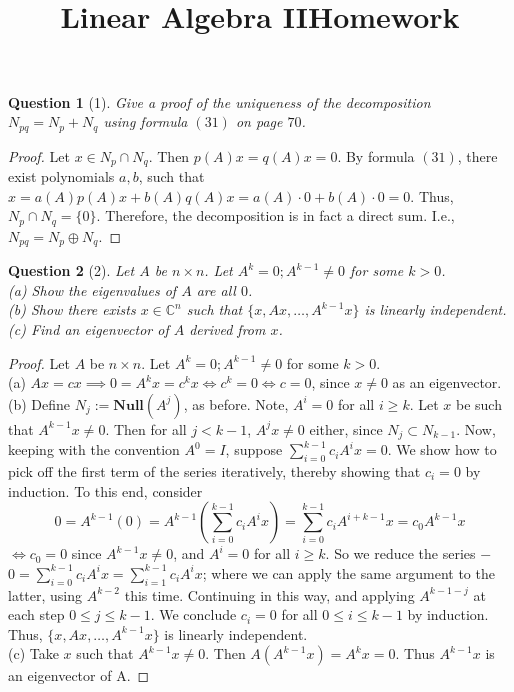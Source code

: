 \documentclass[11pt]{article}
\title{\vspace{-50pt}
\Huge \name
\\\vspace{20pt}
\huge Linear Algebra II\hfill Homework \hw}
\author{}
\date{}
\theoremstyle{quest}
\newtheorem*{question}{Question}
\begin{document}
\maketitle

\begin{question}[1]
Give a proof of the uniqueness of the decomposition $N_{pq} = N_p + N_q$ using formula $(31)$ on page $70$.
\end{question}
\begin{proof}
Let $x \in N_p \cap N_q$. Then $p(A)x = q(A)x = 0$. By formula $(31)$, there exist polynomials $a, b$, such that $x = a(A)p(A)x + b(A)q(A)x = a(A) \cdot 0 + b(A) \cdot 0 = 0$. Thus, $N_p \cap N_q = \{0\}$. Therefore, the decomposition is in fact a direct sum. I.e., $N_{pq} = N_p \oplus N_q$.
\end{proof}
\begin{question}[2]
Let $A$ be $n \times n$. Let $A^k = 0; A^{k-1} \ne 0$ for some $k > 0$.
\\(a) Show the eigenvalues of $A$ are all $0$.
\\(b) Show there exists $x \in \mathbb{C}^n$ such that $\{x, Ax, \ldots, A^{k-1}x\}$ is linearly independent.
\\(c) Find an eigenvector of $A$ derived from $x$.
\end{question}
\begin{proof}
Let $A$ be $n \times n$. Let $A^k = 0; A^{k-1} \ne 0$ for some $k > 0$.
\\(a) $Ax = cx \implies 0 = A^k x = c^k x \iff c^k = 0 \iff c = 0$, since $x \ne 0$ as an eigenvector.
\\ (b) Define $N_j := \mathbf{Null}(A^j)$, as before. Note, $A^i = 0$ for all $i \ge k$. Let $x$ be such that $A^{k-1}x \ne 0$. Then for all $j < k-1$, $A^j x \ne 0$ either, since $N_j \subset N_{k-1}$. Now, keeping with the convention $A^0 = I$, suppose $\sum_{i = 0}^{k-1} c_i A^i x = 0$. We show how to pick off the first term of the series iteratively, thereby showing that $c_i = 0$ by induction. To this end, consider
$$0 = A^{k-1}(0) = A^{k-1}(\sum_{i = 0}^{k-1} c_i A^i x) = \sum_{i = 0}^{k-1} c_i A^{i+k-1} x = c_0 A^{k-1} x$$
$\iff c_0 = 0$ since $A^{k-1}x \ne 0$, and $A^i = 0$ for all $i \ge k$. So we reduce the series $-$ $0 = \sum_{i = 0}^{k-1} c_i A^i x = \sum_{i = 1}^{k-1} c_i A^i x$; where we can apply the same argument to the latter, using $A^{k-2}$ this time. Continuing in this way, and applying $A^{k-1-j}$ at each step $ 0 \le j \le k-1$. We conclude $c_i = 0$ for all $ 0 \le i \le k-1$ by induction. Thus, $\{x, Ax, \ldots, A^{k-1}x\}$ is linearly independent.
\\(c) Take $x$ such that $A^{k-1} x \ne 0$. Then $A(A^{k-1} x) = A^k x = 0$. Thus $A^{k-1} x$ is an eigenvector of A.
\end{proof}
\end{document}

